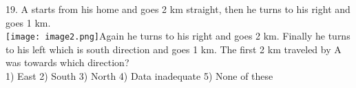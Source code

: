 \documentclass[
]{article}
\begin{document}
19. A starts from his home and goes 2 km straight, then he turns to his right and goes 1 km.\\
\texttt{[image: image2.png]}Again he turns to his right and goes 2 km. Finally he turns to his left which is south direction and goes 1 km. The first 2 km traveled by A was towards which direction?\\
1) East \hspace{2mm}2) South \hspace{2mm}3) North \hspace{2mm}4) Data inadequate \hspace{2mm}5) None of these\\
\end{document}
